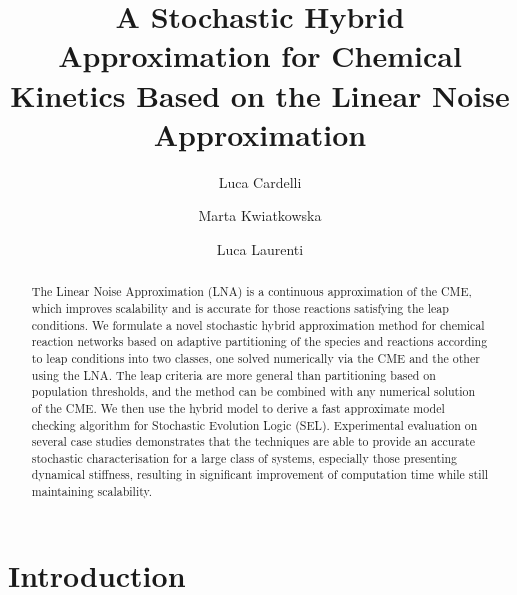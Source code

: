 \documentclass{llncs}
\begin{document}
\newtheorem{mydef}{Definition}
\title{A Stochastic Hybrid Approximation for Chemical Kinetics Based on the Linear Noise Approximation
}

\author{Luca Cardelli \and Marta Kwiatkowska  \and Luca Laurenti }




\maketitle

\begin{abstract}
The Linear Noise Approximation (LNA) is a continuous approximation of the CME, which improves scalability and is accurate for those reactions satisfying the leap conditions. We formulate a novel stochastic hybrid approximation method for chemical reaction networks based on adaptive partitioning of the species and reactions according to leap conditions into two classes, one solved numerically via the CME and the other using the LNA. The leap criteria are more general than partitioning based on population thresholds, and the method can be combined with any numerical solution of the CME. We then use the hybrid model to derive a fast approximate model checking algorithm for Stochastic Evolution Logic (SEL). Experimental evaluation on several case studies demonstrates that the techniques are able to provide an accurate stochastic characterisation for a large class of systems, especially those presenting dynamical stiffness, resulting in significant improvement of computation time while still maintaining scalability.

\end{abstract}
\section{Introduction}
\end{document}

